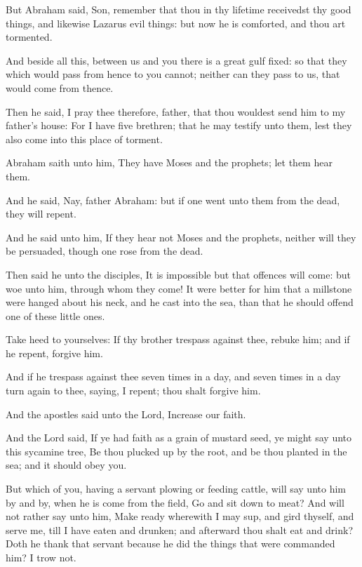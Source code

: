 \Verse But Abraham said, Son, remember that thou in thy lifetime receivedst thy good things, and likewise Lazarus evil things: but now he is comforted, and thou art tormented.

\Verse And beside all this, between us and you there is a great gulf fixed: so that they which would pass from hence to you cannot; neither can they pass to us, that would come from thence.

\Verse Then he said, I pray thee therefore, father, that thou wouldest send him to my father's house: \Verse For I have five brethren; that he may testify unto them, lest they also come into this place of torment.

\Verse Abraham saith unto him, They have Moses and the prophets; let them hear them.

\Verse And he said, Nay, father Abraham: but if one went unto them from the dead, they will repent.

\Verse And he said unto him, If they hear not Moses and the prophets, neither will they be persuaded, though one rose from the dead.


\Chapter
\Verse Then said he unto the disciples, It is impossible but that offences will come: but woe unto him, through whom they come!  \Verse It were better for him that a millstone were hanged about his neck, and he cast into the sea, than that he should offend one of these little ones.

\Verse Take heed to yourselves: If thy brother trespass against thee, rebuke him; and if he repent, forgive him.

\Verse And if he trespass against thee seven times in a day, and seven times in a day turn again to thee, saying, I repent; thou shalt forgive him.

\Verse And the apostles said unto the Lord, Increase our faith.

\Verse And the Lord said, If ye had faith as a grain of mustard seed, ye might say unto this sycamine tree, Be thou plucked up by the root, and be thou planted in the sea; and it should obey you.

\Verse But which of you, having a servant plowing or feeding cattle, will say unto him by and by, when he is come from the field, Go and sit down to meat?  \Verse And will not rather say unto him, Make ready wherewith I may sup, and gird thyself, and serve me, till I have eaten and drunken; and afterward thou shalt eat and drink?  \Verse Doth he thank that servant because he did the things that were commanded him?  I trow not.

